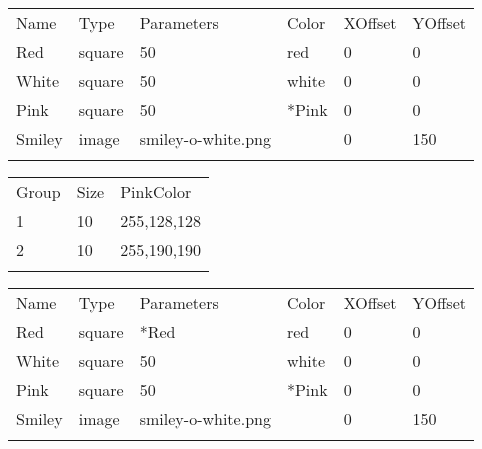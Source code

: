 \documentclass[11pt,]{article}
\renewcommand{\medskip}{}
\begin{document}
\begin{table*}[t]\begin{center}\small\begin{tabular}{@{}llllll@{}}
\hline\noalign{\medskip}
Name & Type & Parameters & Color & XOffset & YOffset
\\\noalign{\medskip}
\hline\noalign{\medskip}
Red & square & 50 & red & 0 & 0
\\\noalign{\medskip}
White & square & 50 & white & 0 & 0
\\\noalign{\medskip}
Pink & square & 50 & *Pink & 0 & 0
\\\noalign{\medskip}
Smiley & image & smiley-o-white.png & & 0 & 150
\\\noalign{\medskip}
\hline
\noalign{\medskip}
\end{tabular}\caption{A \texttt{Stimuli.csv} file instructing alex to look up the
Color of the Pink stimulus in the \texttt{Groups.csv} file.
\label{stimuli-color}}
\end{center}\end{table*}

\begin{table*}[t]\begin{center}\small\begin{tabular}{@{}lll@{}}
\hline\noalign{\medskip}
Group & Size & PinkColor
\\\noalign{\medskip}
\hline\noalign{\medskip}
1 & 10 & 255,128,128
\\\noalign{\medskip}
2 & 10 & 255,190,190
\\\noalign{\medskip}
\hline
\noalign{\medskip}
\end{tabular}\caption{A \texttt{Groups.csv} file instructing alex to run 6 subjects
split in two treatment groups with different Color attributes for the
Pink stimulus (see Table \ref{stimuli-color}). \label{subjects-color}}
\end{center}\end{table*}

\begin{table*}[t]\begin{center}\small\begin{tabular}{@{}llllll@{}}
\hline\noalign{\medskip}
Name & Type & Parameters & Color & XOffset & YOffset
\\\noalign{\medskip}
\hline\noalign{\medskip}
Red & square & *Red & red & 0 & 0
\\\noalign{\medskip}
White & square & 50 & white & 0 & 0
\\\noalign{\medskip}
Pink & square & 50 & *Pink & 0 & 0
\\\noalign{\medskip}
Smiley & image & smiley-o-white.png & & 0 & 150
\\\noalign{\medskip}
\hline
\noalign{\medskip}
\end{tabular}\caption{A \texttt{Stimuli.csv} file instructing alex to run look up in
the \texttt{Groups.csv} file both the Color of stimulus Pink and the
Parameters of stimulus Red (see Table \ref{subjects-color-parameters}).
\label{stimuli-color-parameters}}
\end{center}\end{table*}
\end{document}

